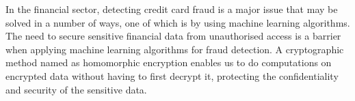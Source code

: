 \documentclass{article}
\begin{document}
In the financial sector, detecting credit card fraud is a major issue that may be solved in a number of ways, one of which is by using machine learning algorithms. The need to secure sensitive financial data from unauthorised access is a barrier when applying machine learning algorithms for fraud detection. A cryptographic method named as homomorphic encryption enables us to do computations on encrypted data without having to first decrypt it, protecting the confidentiality and security of the sensitive data.



\end{document}

